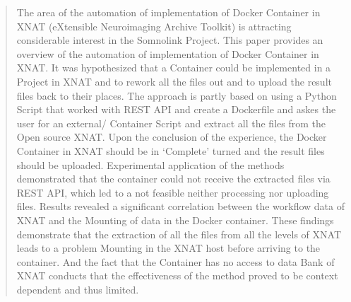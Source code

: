 \begin{abstract}

    The area of the automation of implementation of Docker Container in XNAT (eXtensible Neuroimaging Archive Toolkit) is attracting considerable interest in the Somnolink Project. This paper provides an overview of the automation of implementation of Docker Container in XNAT. It was hypothesized that a Container could be implemented in a Project in XNAT and to rework all the files out and to upload the result files back to their places. The approach is partly based on using a Python Script that worked with REST API and create a Dockerfile and askes the user for an external/ Container Script and extract all the files from the Open source XNAT. Upon the conclusion of the experience, the Docker Container in XNAT should be in ‘Complete’ turned and the result files should be uploaded. Experimental application of the methods demonstrated that the container could not receive the extracted files via REST API, which led to a not feasible neither processing nor uploading files. Results revealed a significant correlation between the workflow data of XNAT and the Mounting of data in the Docker container. These findings demonstrate that the extraction of all the files from all the levels of XNAT leads to a problem Mounting in the XNAT host before arriving to the container. And the fact that the Container has no access to data Bank of XNAT conducts that the effectiveness of the method proved to be context dependent and thus limited.
\end{abstract}

